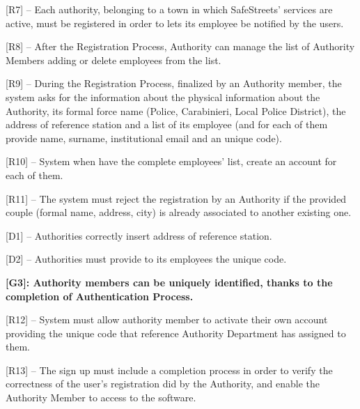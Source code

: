 \documentclass[12pt]{article}
\begin{document}
\begin{flushleft}


[R7] -- Each authority, belonging to a town in which SafeStreets’ services are active, must be registered in order to lets its employee be notified by the users.
\vspace{2mm}

[R8] – After the Registration Process, Authority can manage the list of Authority Members adding or delete employees from the list.
\vspace{2mm}

[R9] – During the Registration Process, finalized by an Authority member, the system asks for the information about the physical information about the Authority, its formal force name (Police, Carabinieri, Local Police District), the address of reference station and a list of its employee (and for each of them provide name, surname, institutional email and an unique code).
\vspace{2mm}

[R10] – System when have the complete employees’ list, create an account for each of them.
\vspace{2mm}

[R11] – The system must reject the registration by an Authority if the provided couple (formal name, address, city) is already associated to another existing one.
\vspace{2mm}

[D1] -- Authorities correctly insert address of reference station.
\vspace{2mm}

[D2] – Authorities must provide to its employees the unique code. 
\vspace{2mm}


\vspace{4mm}
\textbf{[G3]: Authority members can be uniquely identified, thanks to the completion of Authentication Process.}
\vspace{2mm}

[R12] -- System must allow authority member to activate their own account providing the unique code that reference Authority Department has assigned to them.
\vspace{2mm}

[R13] – The sign up must include a completion process in order to verify the correctness of the user’s registration did by the Authority, and enable the Authority Member to access to the software.
\vspace{2mm}


\end{flushleft}
\end{document}
